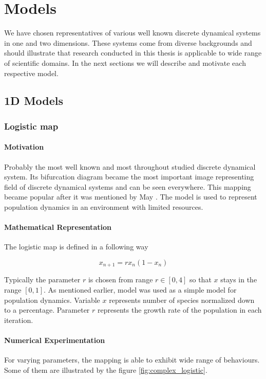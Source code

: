 \chapter{Models}
We have chosen representatives of various well known discrete dynamical systems in one and two dimensions. These systems come from diverse backgrounds and should illustrate that research conducted in this thesis is applicable to wide range of scientific domains. In the next sections we will describe and motivate each respective model.

\section{1D Models}

\subsection{Logistic map}
\label{subsec:logistic map}

\subsubsection{Motivation}
Probably the most well known and most throughout studied discrete dynamical system.
Its bifurcation diagram became the most important image representing field of discrete dynamical systems and can be seen everywhere.
This mapping became popular after it was mentioned by May \cite{May19760610}.
The model is used to represent population dynamics in an environment with limited resources.

\subsubsection{Mathematical Representation}
The logistic map is defined in a following way

\begin{equation}
    x_{n+1} = r x_{n} ( 1 - x_{n} )
\end{equation}

Typically the parameter $r$ is chosen from range $r \in [0, 4]$ so that $x$ stays in the range $[0,1]$.
As mentioned earlier, model was used as a simple model for population dynamics.
Variable $x$ represents number of species normalized down to a percentage.
Parameter $r$ represents the growth rate of the population in each iteration.

\subsubsection{Numerical Experimentation}
For varying parameters, the mapping is able to exhibit wide range of behaviours.
Some of them are illustrated by the figure \ref{fig:complex_logistic}.

